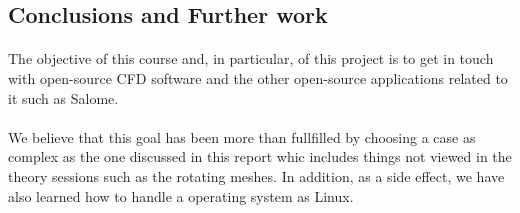 \subsection{Conclusions and Further work}

\paragraph{}The objective of this course and, in particular, of this project is to get in touch with open-source CFD software and the other open-source applications related to it such as Salome.
\paragraph{}We believe that this goal has been more than fullfilled by choosing a case as complex as the one discussed in this report whic includes things not viewed in the theory sessions such as the rotating meshes. In addition, as a side effect, we have also learned how to handle a operating system as Linux.
